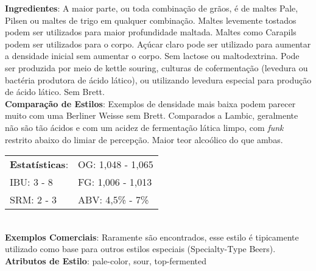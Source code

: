 \textbf{Ingredientes}: A maior parte, ou toda combinação de grãos, é de maltes Pale, Pilsen ou maltes de trigo em qualquer combinação. Maltes levemente tostados podem ser utilizados para maior profundidade maltada. Maltes como Carapils podem ser utilizados para o corpo. Açúcar claro pode ser utilizado para aumentar a densidade inicial sem aumentar o corpo. Sem lactose ou maltodextrina. Pode ser produzida por meio de kettle souring, culturas de cofermentação (levedura ou bactéria produtora de ácido lático), ou utilizando levedura especial para produção de ácido lático. Sem Brett. \\
\textbf{Comparação de Estilos}: Exemplos de densidade mais baixa podem parecer muito com uma Berliner Weisse sem Brett. Comparados a Lambic, geralmente não são tão ácidos e com um acidez de fermentação lática limpo, com \textit{funk} restrito abaixo do limiar de percepção. Maior teor alcoólico do que ambas. \\
\begin{tabular}{@{}p{35mm}p{35mm}@{}}
  \textbf{Estatísticas}: & OG: 1,048 - 1,065 \\
  IBU: 3 - 8  & FG: 1,006 - 1,013 \\
  SRM: 2 - 3  & ABV: 4,5\% - 7\%
\end{tabular}\\
\textbf{Exemplos Comerciais}: Raramente são encontrados, esse estilo é tipicamente utilizado como base para outros estilos especiais (Specialty-Type Beers). \\
\textbf{Atributos de Estilo}: pale-color, sour, top-fermented
